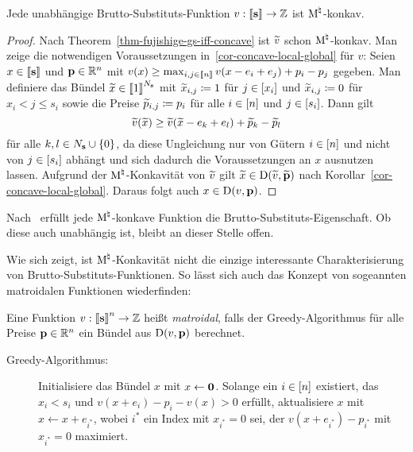 \begin{korollar}\label{cor-indep-gs-m-concave}
	Jede unabhängige Brutto-Substituts-Funktion $v:\left\llbracket \mathbf{s} \right\rrbracket \rightarrow \mathbb{Z}$ ist $\textrm{\textup{M}}^\natural$-konkav.
\end{korollar}
\begin{proof}
	Nach Theorem~\ref{thm-fujishige-gs-iff-concave} ist $\widetilde{v}$ schon $\textrm{\textup{M}}^\natural$-konkav.
	Man zeige die notwendigen Voraussetzungen in~\ref{cor-concave-local-global} für $v$:
	Seien $x\in\left\llbracket \mathbf{s} \right\rrbracket$ und $\mathbf{p}\in\mathbb{R}^n$ mit $v(x)\geq \max_{i,j\in\left\llbracket n \right\rrbracket} v(x - e_i + e_j) + p_i - p_j$ gegeben.
	Man definiere das Bündel $\widetilde{x}\in\left\llbracket 1 \right\rrbracket^{N_{\mathbf{s}}}$ mit $\widetilde{x}_{i,j} \coloneqq 1$ für $j\in\left[ x_i \right]$ und $\widetilde{x}_{i,j} \coloneqq 0$ für $x_i < j \leq s_i$ sowie die Preise $\widetilde{p}_{i,j}\coloneqq p_i$ für alle $i\in\left[ n \right]$ und $j\in\left[ s_i \right]$.
	Dann
	gilt \[
	\widetilde{v}(\widetilde{x}) \geq \widetilde{v}(\widetilde{x} - e_k + e_l) + \widetilde{p}_k - \widetilde{p}_l
	\] für alle $k, l \in N_{\mathbf{s}} \cup\{ 0 \}$, da diese Ungleichung nur von Gütern $i\in\left[ n \right]$ und nicht von $j\in\left[ s_i \right]$ abhängt und sich dadurch die Voraussetzungen an $x$ ausnutzen lassen.
	Aufgrund der $\textrm{\textup{M}}^\natural$-Konkavität von $\widetilde{v}$ gilt $\widetilde{x}\in\operatorname{D}(\widetilde{v}, \widetilde{\mathbf{p}})$ nach Korollar~\ref{cor-concave-local-global}. Daraus folgt auch $x\in\operatorname{D}(v,\mathbf{p})$.
\end{proof}
\begin{bemerkung}
	Nach~\cite[Theorem~11.4]{Murota2003} erfüllt jede $\textrm{\textup{M}}^\natural$-konkave Funktion die Brutto-Substituts-Eigenschaft.
	Ob diese auch unabhängig ist, bleibt an dieser Stelle offen.
\end{bemerkung}

Wie sich zeigt, ist $\textrm{\textup{M}}^\natural$-Konkavität nicht die einzige interessante Charakterisierung von Brutto-Substituts-Funktionen.
So lässt sich auch das Konzept von sogeannten matroidalen Funktionen wiederfinden:
\begin{definition}
	Eine Funktion $v:\left\llbracket \mathbf{s} \right\rrbracket^n\rightarrow \mathbb{Z}$ heißt \emph{matroidal}, falls
	der Greedy-Algorithmus für alle Preise $\mathbf{p}\in\mathbb{R}^n$ ein Bündel aus $\operatorname{D}(v, \mathbf{p})$ berechnet.
	\begin{description}
		\item[Greedy-Algorithmus:] Initialisiere das Bündel $x$ mit $x\leftarrow \mathbf{0}$.
		Solange ein $i\in\left[ n \right]$ existiert, das $x_i < s_i$ und $v(x + e_i) - p_i - v(x) > 0$ erfüllt,
		aktualisiere $x$ mit $x\leftarrow x + e_{i^*}$, wobei $i^*$ ein Index mit $x_{i^*}=0$ sei, der $v(x + e_{i^*}) - p_{i^*}$ mit $x_{i^*} = 0$ maximiert.
	\end{description}
\end{definition}

